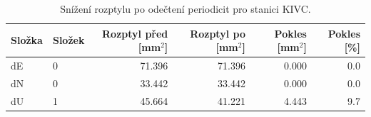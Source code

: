 \begin{table}[H]
\centering
\small
\caption{Snížení rozptylu po odečtení periodicit pro stanici KIVC.}
\label{tab:gop25wd04_stcd_kivc_detr_weighted_1seg_spectral_fft_variance_reduction}
\begin{tabular}{llrrrr}
\toprule
Složka & Složek & Rozptyl před [mm$^2$] & Rozptyl po [mm$^2$] & Pokles [mm$^2$] & Pokles [\%] \\
\midrule
dE & 0 & 71.396 & 71.396 & 0.000 & 0.0 \\
dN & 0 & 33.442 & 33.442 & 0.000 & 0.0 \\
dU & 1 & 45.664 & 41.221 & 4.443 & 9.7 \\
\bottomrule
\end{tabular}
\end{table}
